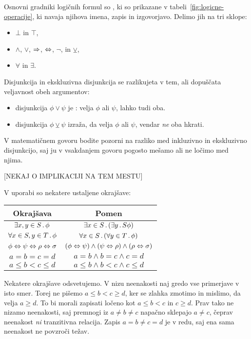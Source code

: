 Osnovni gradniki logičnih formul so , ki so prikazane v tabeli~\ref{fig:logicne-operacije},
ki navaja njihova imena, zapis in izgovorjavo.
%
Delimo jih na tri sklope:
%
\begin{itemize}
\item {} $\bot$ in $\top$,
\item {} $\land$, $\lor$, $\Rightarrow$, $\Leftrightarrow$, $\neg$, in $\veebar$,
\item {} $\forall$ in $\exists$.
\end{itemize}
%

Disjunkcija in ekskluzivna disjunkcija se razlikujeta v tem, ali dopuščata veljavnost obeh argumentov:
%
\begin{itemize}
\item disjunkcija $\phi \lor \psi$ je : velja $\phi$ ali $\psi$, lahko tudi oba.
\item {} disjunkcija $\phi \veebar \psi$ izraža, da velja $\phi$ ali $\psi$, vendar \emph{ne} oba hkrati.
\end{itemize}
%
V matematičnem govoru bodite pozorni na razliko med inkluzivno in ekskluzivno disjunkcijo, saj ju v vsakdanjem govoru pogosto mešamo ali ne ločimo med njima.

[NEKAJ O IMPLIKACIJI NA TEM MESTU]

V uporabi so nekatere ustaljene okrajšave:
%
\begin{center}
  \begin{tabular}{cc}
    \toprule
    Okrajšava & Pomen \\ \midrule
    $\exists x,y \in S \,.\, \phi$
    &
    $\exists x \in S \,.\, (\exists y \,.\,{S} \phi)$
    \\
    $\forall x \in S, y \in T \,.\, \phi$
    &
    $\forall x \in S \,.\,(\forall y \in T \,.\, \phi)$
    \\
    $\phi \Leftrightarrow \psi \Leftrightarrow \rho \Leftrightarrow \sigma$
    &
    $(\phi \Leftrightarrow \psi) \land (\psi \Leftrightarrow \rho) \land (\rho \Leftrightarrow \sigma)$
    \\
    $a = b = c = d$
    &
    $a = b \land b = c \land c = d$
    \\
    $a \leq b < c \leq d$
    &
    $a \leq b \land b < c \land c \leq d$
    \\
    \bottomrule
  \end{tabular}
\end{center}
%
Nekatere okrajšave odsvetujemo. V nizu neenakosti naj gredo vse
primerjave v isto smer. Torej ne pišemo $a \leq b < c \geq d$, ker se
zlahka zmotimo in mislimo, da velja $a \geq d$. To bi morali zapisati
ločeno kot $a \leq b < c$ in $c \geq d$. Prav tako ne nizamo neenakosti,
saj premnogi iz $a \neq b \neq c$ napačno sklepajo $a \neq c$,
čeprav neenakost \emph{ni} tranzitivna relacija. Zapis $a =
b \neq c = d$ je v redu, saj ena sama neenakost ne povzroči težav.

